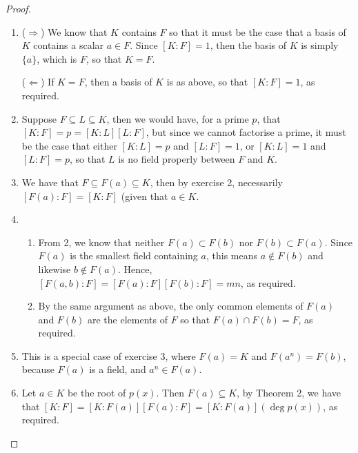 \begin{proof}
 \begin{enumerate}
     \item ($\Rightarrow$) We know that $K$ contains $F$ so that it must be the case that a basis of $K$ contains a scalar $a\in F$. Since $[K:F]=1$, then the basis of $K$ is simply $\{a\}$, which is $F$, so that $K=F$.

     ($\Leftarrow$) If $K=F$, then a basis of $K$ is as above, so that $[K:F]=1$, as required.
     \item Suppose $F\subseteq L\subseteq K$, then we would have, for a prime $p$, that $[K:F]=p=[K:L][L:F]$, but since we cannot factorise a prime, it must be the case that either $[K:L]=p$ and $[L:F]=1$, or $[K:L]=1$ and $[L:F]=p$, so that $L$ is no field properly between $F$ and $K$.
     \item We have that $F\subseteq F(a)\subseteq K$, then by exercise 2, necessarily $[F(a):F]=[K:F]$ (given that $a\in K$.
     \item 
         \begin{enumerate}
             \item From 2, we know that neither $F(a)\subset F(b)$ nor $F(b)\subset F(a)$. Since $F(a)$ is the smallest field containing $a$, this means $a\notin F(b)$ and likewise $b\notin F(a)$. Hence, $[F(a,b):F]=[F(a):F][F(b):F]=mn$, as required.
             \item By the same argument as above, the only common elements of $F(a)$ and $F(b)$ are the elements of $F$ so that $F(a)\cap F(b)=F$, as required.
         \end{enumerate}
    \item This is a special case of exercise 3, where $F(a)=K$ and $F(a^n)=F(b)$, because $F(a)$ is a field, and $a^n\in F(a)$. 
    \item Let $a\in K$ be the root of $p(x)$. Then $F(a)\subseteq K$, by Theorem 2, we have that $[K:F]=[K:F(a)][F(a):F]=[K:F(a)](\deg p(x))$, as required.
 \end{enumerate}
\end{proof}

